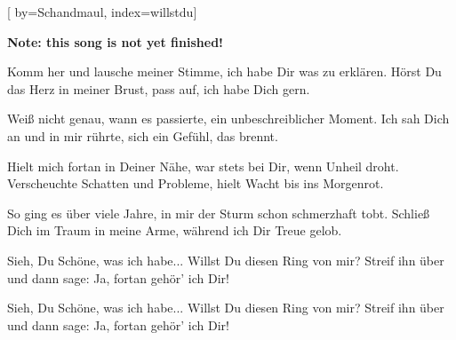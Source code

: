 
[%
    by={Schandmaul},
    index={willstdu}]


    \label{willstdu}

    \textbf{Note: this song is not yet finished!}

    \beginverse
        Komm her und lausche meiner Stimme,
        ich habe Dir was zu erkl\"{a}ren.
        H\"{o}rst Du das Herz in meiner Brust,
        pass auf, ich habe Dich gern.
    \endverse

    \beginverse
        Wei\ss{} nicht genau, wann es passierte,
        ein unbeschreiblicher Moment.
        Ich sah Dich an und in mir r\"{u}hrte,
        sich ein Gef\"{u}hl, das brennt.
    \endverse

    \beginverse
        Hielt mich fortan in Deiner N\"{a}he,
        war stets bei Dir, wenn Unheil droht.
        Verscheuchte Schatten und Probleme,
        hielt Wacht bis ins Morgenrot.
    \endverse

    \beginverse
        So ging es \"{u}ber viele Jahre,
        in mir der Sturm schon schmerzhaft tobt.
        Schlie\ss{} Dich im Traum in meine Arme,
        w\"{a}hrend ich Dir Treue gelob.
    \endverse

    \beginchorus
        Sieh, Du Sch\"{o}ne, was ich habe...
        Willst Du diesen Ring von mir?
        Streif ihn \"{u}ber und dann sage:
        Ja, fortan geh\"{o}r' ich Dir!
    \endchorus

    \beginverse*
    \endverse

    \beginchorus
        Sieh, Du Sch\"{o}ne, was ich habe...
        Willst Du diesen Ring von mir?
        Streif ihn \"{u}ber und dann sage:
        Ja, fortan geh\"{o}r' ich Dir!
    \endchorus
\endsong
